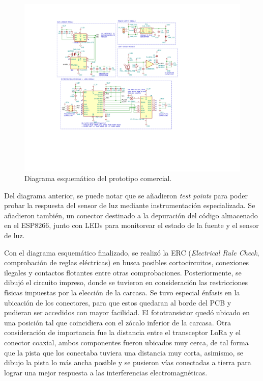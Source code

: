 \begin{figure}[h]
	\centering
	\includegraphics[scale=0.9]{./Figures/schematic.pdf}
	\caption{Diagrama esquemático del prototipo comercial.}
		\label{fig:cuadradoAzul}
\end{figure}

Del diagrama anterior, se puede notar que se añadieron \textit{test points} para poder probar la respuesta del sensor de luz mediante instrumentación especializada. Se añadieron también, un conector destinado a la depuración del código almacenado en el ESP8266, junto con LEDs para monitorear el estado de la fuente y el sensor de luz.

Con el diagrama esquemático finalizado, se realizó la ERC (\textit{Electrical Rule Check}, comprobación de reglas eléctricas) en busca posibles cortocircuitos, conexiones ilegales y contactos flotantes entre otras comprobaciones. Posteriormente, se dibujó el circuito impreso, donde se tuvieron en consideración las restricciones físicas impuestas por la elección de la carcasa. Se tuvo especial énfasis en la ubicación de los conectores, para que estos quedaran al borde del PCB y pudieran ser accedidos con mayor facilidad. El fototransistor quedó ubicado en una posición tal que coincidiera con el zócalo inferior de la carcasa. Otra consideración de importancia fue la distancia entre el transceptor LoRa y el conector coaxial, ambos componentes fueron ubicados muy cerca, de tal forma que la pista que los conectaba tuviera una distancia muy corta, asimismo, se dibujo la pista lo más ancha posible y se pusieron vías conectadas a tierra para lograr una mejor respuesta a las interferencias electromagnéticas.

